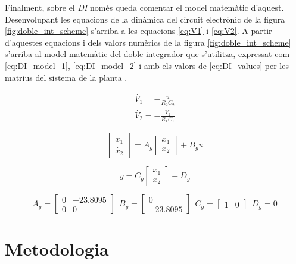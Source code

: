 \documentclass[12pt,a4paper,final,twoside,openright]{report}
\begin{document}
\newpage %
Finalment, sobre el \textit{DI} només queda comentar el model matemàtic d'aquest. Desenvolupant les equacions de la dinàmica del circuit electrònic de la figura \ref{fig:doble_int_scheme} s'arriba a les equacions \eqref{eq:V1} i \eqref{eq:V2}. A partir d'aquestes equacions i dels valors numèrics de la figura \ref{fig:doble_int_scheme} s'arriba al model matemàtic del doble integrador que s'utilitza, expressat com \eqref{eq:DI_model_1}, \eqref{eq:DI_model_2} i amb els valors de \eqref{eq:DI_values} per les matrius del sistema de la planta .

\begin{eqnarray}
\dot{V_1} = - \frac{u}{R_2 C_2}\label{eq:V1} \\
\dot{V_2} = - \frac{V_2}{R_1 C_1}\label{eq:V2}
\end{eqnarray}

\begin{equation}\label{eq:DI_model_1}
\begin{bmatrix}
\dot{x_1}\\
\dot{x_2}
\end{bmatrix}
=
A_g
\begin{bmatrix}
x_1\\
x_2
\end{bmatrix}
+
B_g
u
\end{equation}

\begin{equation}\label{eq:DI_model_2}
y = C_g
\begin{bmatrix}
x_1\\
x_2
\end{bmatrix}
+ D_g
\end{equation}

\begin{equation}\label{eq:DI_values}
A_g = \begin{bmatrix}
0 & -23.8095\\
0 & 0
\end{bmatrix}
~~
B_g = \begin{bmatrix}
0 \\
-23.8095
\end{bmatrix}
~~
C_g = \begin{bmatrix}
1 & 0
\end{bmatrix}
~~
D_g = 0
\end{equation}

\newpage
\section{Metodologia}
\end{document}
